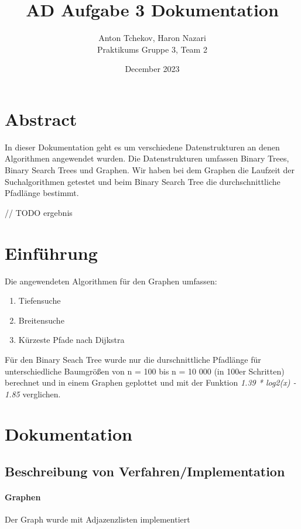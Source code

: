 \documentclass[utf8]{article}
\title{AD Aufgabe 3 Dokumentation}
\author{Anton Tchekov, Haron Nazari\\ Praktikums Gruppe 3, Team 2}
\date{December 2023}
\begin{document}
\maketitle

\section{Abstract}
In dieser Dokumentation geht es um verschiedene Datenstrukturen an denen
Algorithmen angewendet wurden.
Die Datenstrukturen umfassen Binary Trees, Binary Search Trees und Graphen.
Wir haben bei dem Graphen die Laufzeit der Suchalgorithmen getestet und
beim Binary Search Tree die durchschnittliche Pfadlänge bestimmt.

// TODO ergebnis

\section{Einführung}
Die angewendeten Algorithmen für den Graphen umfassen:
\begin{enumerate}
  \item Tiefensuche
  \item Breitensuche
  \item Kürzeste Pfade nach Dijkstra
\end{enumerate}
Für den Binary Seach Tree wurde nur die durschnittliche Pfadlänge für
unterschiedliche Baumgrößen von n = 100 bis n = 10 000 (in 100er Schritten)
berechnet und in einem Graphen geplottet und mit der
Funktion \emph{1.39 * log2(x) - 1.85} verglichen.
\pagebreak
\section{Dokumentation}

\subsection{Beschreibung von Verfahren/Implementation}

\paragraph{Graphen}
Der Graph wurde mit Adjazenzlisten implementiert
\end{document}
